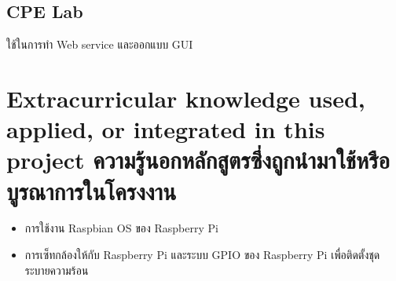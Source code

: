 \subsection{CPE Lab}
ใช้ในการทำ Web service และออกแบบ GUI

\section{\ifenglish%
Extracurricular knowledge used, applied, or integrated in this project
\else%
ความรู้นอกหลักสูตรซึ่งถูกนำมาใช้หรือบูรณาการในโครงงาน
\fi
}
\begin{itemize}
  \item การใช้งาน Raspbian OS ของ Raspberry Pi
  \item การเซ็ทกล้องให้กับ Raspberry Pi และระบบ GPIO ของ Raspberry Pi เพื่อติดตั้งชุดระบายความร้อน
\end{itemize}







